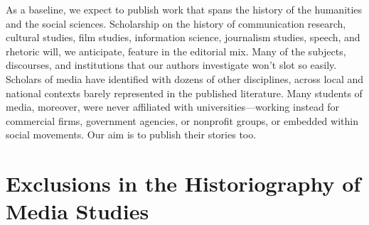 \documentclass{tufte-handout}
\begin{document}
As a baseline, we expect to publish work that spans the history of the
humanities and the social sciences. Scholarship on the history of
communication research, cultural studies, film studies, information
science, journalism studies, speech, and rhetoric will, we anticipate,
feature in the editorial mix. Many of the subjects, discourses, and
institutions that our authors investigate won't slot so easily. Scholars
of media have identified with dozens of other disciplines, across local
and national contexts barely represented in the published literature.
Many students of media, moreover, were never affiliated with
universities---working instead for commercial firms, government
agencies, or nonprofit groups, or embedded within social movements. Our
aim is to publish their stories too.

\hypertarget{exclusions-in-the-historiography-of-media-studies}{%
\section{Exclusions in the Historiography of Media
Studies}\label{exclusions-in-the-historiography-of-media-studies}}
\end{document}
